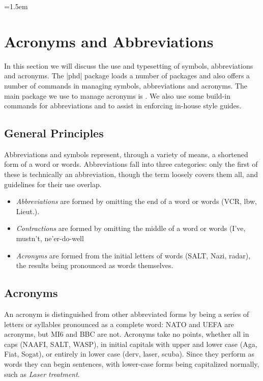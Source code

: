 \parindent=1.5em



\chapter{Acronyms and Abbreviations}


In this section we will discuss the use and typesetting of symbols, abbreviations and acronyms. The |phd| package loads a number of packages and also offers a number of commands in managing symbols, abbreviations and acronyms. The main package we use to manage acronyms is  \cite{acronym}. We also use some build-in commands for abbreviations and to assist in enforcing in-house style guides.

\section{General Principles}

Abbreviations and symbols represent, through a variety of means, a
shortened form of a word or words. Abbreviations fall into three categories:
only the first of these is technically an abbreviation, though the
term loosely covers them all, and guidelines for their use overlap.

\begin{itemize}
\item \textit{Abbreviations} are formed by omitting the end of a word or words (VCR, lbw, Lieut.).
\item \textit{Contractions} are formed by omitting the middle of a word or words (I've,
mustn't, ne'er-do-well
\item \textit{Acronyms} are formed from the initial letters of words (SALT, Nazi, radar), the results being pronounced as words themselves.
\end{itemize}

\section{Acronyms}

An acronym is distinguished from other abbreviated forms by being a series of letters or syllables pronounced as a complete word: \textsc{NATO}
and UEFA are acronyms, but MI6 and BBC are not. Acronyms take no
points, whether all in caps (NAAFI, SALT, WASP), in initial capitals with
upper and lower case (Aga, Fiat, Sogat), or entirely in lower case (derv,
laser, scuba). Since they perform as words they can begin sentences, with
lower-case forms being capitalized normally, such as \textit{Laser treatment}. 

